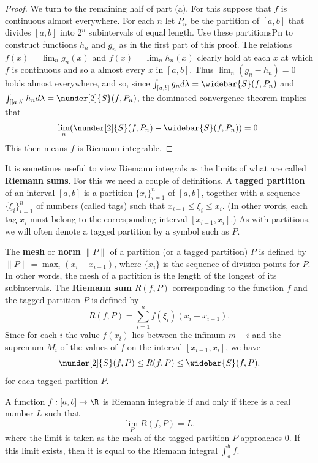 \begin{proof}
We turn to the remaining half of part (a). For this suppose that $f$ is continuous almost everywhere. For each $n$ let $P_n$ be the partition of $[a,b]$ that divides $[a,b]$ into $2^n$ subintervals of equal length. Use these partitionsPn to construct functions $h_n$ and $g_n$ as in the first part of this proof. The relations $f(x)=\lim_ng_n(x)$ and $f(x)=\lim_nh_n(x)$ clearly hold at each $x$ at which $f$ is continuous and so a almost every $x$ in $[a,b]$. Thus $\lim_n(g_n-h_n)=0$ holds almost everywhere, and so, since $\int_{[a,b]}g_nd\lambda=\widebar{S}(f,P_n)$ and $\int_{[[a,b]}h_nd\lambda=\nunder[2]{S}(f,P_n)$, the dominated convergence theorem implies that
\[\lim_n(\nunder[2]{S}(f,P_n)-\widebar{S}(f,P_n))=0.\]
This then means $f$ is Riemann integrable.
\end{proof}
It is sometimes useful to view Riemann integrals as the limits of what are called \textbf{Riemann sums}. For this we need a couple of definitions. A \textbf{tagged partition} of an interval $[a,b]$ is a partition $\{x_i\}_{i=1}^{n}$ of $[a,b]$, together with a sequence $\{\xi_i\}_{i=1}^{n}$ of numbers (called tags) such that $x_{i-1}\leq\xi_i\leq x_i$. (In other words, each tag $x_i$ must belong to the corresponding interval $[x_{i-1},x_i]$.) As with partitions, we will often denote a tagged partition by a symbol such as $P$.\par
The \textbf{mesh} or \textbf{norm} $\|P\|$ of a partition (or a tagged partition) $P$ is defined by $\|P\|=\max_i(x_i-x_{i-1})$, where $\{x_i\}$ is the sequence of division points for $P$. In other words, the mesh of a partition is the length of the longest of its subintervals. The \textbf{Riemann sum} $R(f,P)$ corresponding to the function $f$ and the tagged partition $P$ is defined by
\[R(f,P)=\sum_{i=1}^{n}f(\xi_i)(x_i-x_{i-1}).\]
Since for each $i$ the value $f(x_i)$ lies between the infimum $m+i$ and the supremum $M_i$ of the values of $f$ on the interval $[x_{i-1},x_i]$, we have
\[\nunder[2]{S}(f,P)\leq R(f,P)\leq\widebar{S}(f,P).\]
for each tagged partition $P$.
\begin{proposition}
A function $f:[a,b]\to\R$ is Riemann integrable if and only if there is a real number $L$ such that
\[\lim_{P}R(f,P)=L.\]
where the limit is taken as the mesh of the tagged partition $P$ approaches $0$. If this limit exists, then it is equal to the Riemann integral $\int_a^bf$.
\end{proposition}
